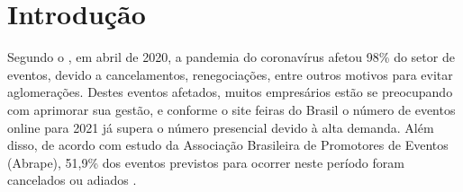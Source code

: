\chapter{Introdução}
\label{chp:LABEL_CHP_1}


Segundo o , em abril de 2020, a pandemia do coronavírus afetou 98\% do setor de eventos, devido a cancelamentos, renegociações, entre outros motivos para evitar aglomerações. Destes eventos afetados, muitos empresários estão se preocupando com aprimorar sua gestão, e conforme o site feiras do Brasil o número de eventos online para 2021 já supera o número presencial devido à alta demanda. Além disso, de acordo com estudo da Associação Brasileira de Promotores de Eventos (Abrape), 51,9\% dos eventos previstos para ocorrer neste período foram cancelados ou adiados \cite{FEIRA}.

